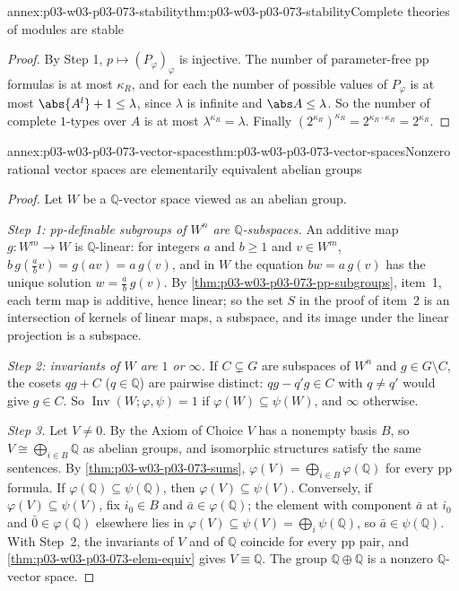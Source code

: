 \begin{annexitem}{annex:p03-w03-p03-073-stability}{thm:p03-w03-p03-073-stability}{Complete theories of modules are stable}
\begin{proof}
By Step 1, \(p\mapsto(P_\varphi)_\varphi\) is injective. The number of
parameter-free pp formulas is at most \(\kappa_R\), and for each the
number of possible values of \(P_\varphi\) is at most
\(\abs{A^l}+1\le\lambda\), since \(\lambda\) is infinite and
\(\abs A\le\lambda\). So the number of complete \(1\)-types over \(A\) is
at most \(\lambda^{\kappa_R}=\lambda\). Finally
\((2^{\kappa_R})^{\kappa_R}=2^{\kappa_R\cdot\kappa_R}=2^{\kappa_R}\).
\end{proof}
\end{annexitem}

\begin{annexitem}{annex:p03-w03-p03-073-vector-spaces}{thm:p03-w03-p03-073-vector-spaces}{Nonzero rational vector spaces are elementarily equivalent abelian groups}
\begin{proof}
Let \(W\) be a \(\mathbb Q\)-vector space viewed as an abelian group.

\emph{Step 1: pp-definable subgroups of \(W^n\) are
\(\mathbb Q\)-subspaces.} An additive map \(g:W^m\to W\) is
\(\mathbb Q\)-linear: for integers \(a\) and \(b\ge1\) and \(v\in W^m\),
\(b\,g(\tfrac abv)=g(av)=a\,g(v)\), and in \(W\) the equation \(bw=a\,g(v)\)
has the unique solution \(w=\tfrac ab\,g(v)\). By
\cref{thm:p03-w03-p03-073-pp-subgroups}, item~1, each term map is
additive, hence linear; so the set \(S\) in the proof of item~2 is an
intersection of kernels of linear maps, a subspace, and its image under the
linear projection is a subspace.

\emph{Step 2: invariants of \(W\) are \(1\) or \(\infty\).} If
\(C\subsetneq G\) are subspaces of \(W^n\) and \(g\in G\setminus C\), the
cosets \(qg+C\) (\(q\in\mathbb Q\)) are pairwise distinct: \(qg-q'g\in C\)
with \(q\neq q'\) would give \(g\in C\). So
\(\operatorname{Inv}(W;\varphi,\psi)=1\) if
\(\varphi(W)\subseteq\psi(W)\), and \(\infty\) otherwise.

\emph{Step 3.} Let \(V\neq0\). By the Axiom of Choice \(V\) has a nonempty
basis \(B\), so \(V\cong\bigoplus_{i\in B}\mathbb Q\) as abelian groups,
and isomorphic structures satisfy the same sentences. By
\cref{thm:p03-w03-p03-073-sums},
\(\varphi(V)=\bigoplus_{i\in B}\varphi(\mathbb Q)\) for every pp formula.
If \(\varphi(\mathbb Q)\subseteq\psi(\mathbb Q)\), then
\(\varphi(V)\subseteq\psi(V)\). Conversely, if
\(\varphi(V)\subseteq\psi(V)\), fix \(i_0\in B\) and
\(\bar a\in\varphi(\mathbb Q)\); the element with component \(\bar a\) at
\(i_0\) and \(\bar0\in\varphi(\mathbb Q)\) elsewhere lies in
\(\varphi(V)\subseteq\psi(V)=\bigoplus_i\psi(\mathbb Q)\), so
\(\bar a\in\psi(\mathbb Q)\). With Step~2, the invariants of \(V\) and of
\(\mathbb Q\) coincide for every pp pair, and
\cref{thm:p03-w03-p03-073-elem-equiv} gives \(V\equiv\mathbb Q\). The
group \(\mathbb Q\oplus\mathbb Q\) is a nonzero \(\mathbb Q\)-vector space.
\end{proof}
\end{annexitem}

